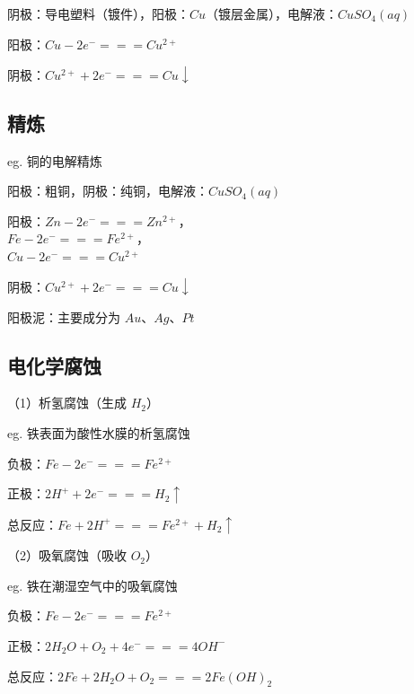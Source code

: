 \documentclass[UTF8,zihao=-4,openany]{ctexbook}
\begin{document}
阴极：导电塑料（镀件），阳极：$Cu$（镀层金属），电解液：$CuSO_4(aq)$\par

阳极：$Cu-2e^-=\!=\!=Cu^{2+}$\par

阴极：$Cu^{2+}+2e^-=\!=\!=Cu\downarrow$\par
\subsection{精炼}
eg. 铜的电解精炼\par

阳极：粗铜，阴极：纯铜，电解液：$CuSO_4(aq)$\par

阳极：$Zn-2e^-=\!=\!=Zn^{2+}$，\\[0.25em]
\hspace*{2em}$Fe-2e^-=\!=\!=Fe^{2+}$，\\[0.25em]
\hspace*{2em}$Cu-2e^-=\!=\!=Cu^{2+}$\par

阴极：$Cu^{2+}+2e^-=\!=\!=Cu\downarrow$\par

阳极泥：主要成分为 $Au$、$Ag$、$Pt$\par
\subsection{电化学腐蚀}
（1）析氢腐蚀（生成 $H_2$）\par

eg. 铁表面为酸性水膜的析氢腐蚀\par

负极：$Fe-2e^-=\!=\!=Fe^{2+}$\par

正极：$2H^++2e^-=\!=\!=H_2\uparrow$\par

总反应：$Fe+2H^+=\!=\!=Fe^{2+}+H_2\uparrow$\par

（2）吸氧腐蚀（吸收 $O_2$）\par

eg. 铁在潮湿空气中的吸氧腐蚀\par

负极：$Fe-2e^-=\!=\!=Fe^{2+}$\par

正极：$2H_2O+O_2+4e^-=\!=\!=4OH^-$\par

总反应：$2Fe+2H_2O+O_2=\!=\!=2Fe(OH)_2$\par
\end{document}
